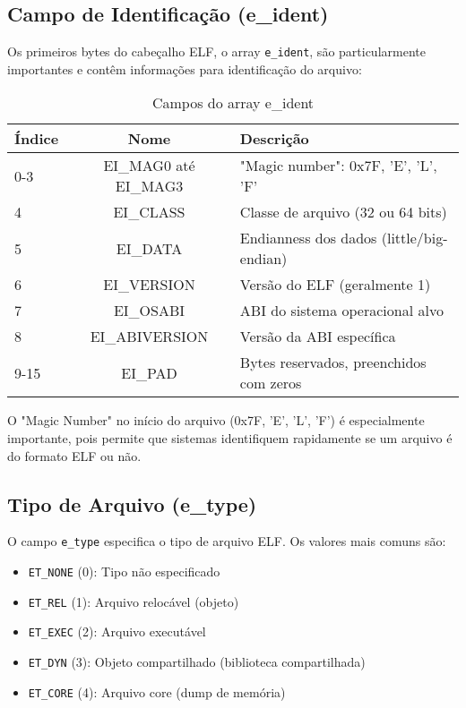 \subsection{Campo de Identificação (e\_ident)}\label{subsec:e_ident}

Os primeiros bytes do cabeçalho ELF, o array \texttt{e\_ident}, são particularmente importantes e contêm informações para identificação do arquivo:

\begin{table}[ht]
    \centering
    \caption{Campos do array e\_ident}
    \label{tab:e_ident_fields}
    \begin{tabular}{|l|c|l|}
        \hline
        \textbf{Índice} & \textbf{Nome} & \textbf{Descrição} \\
        \hline
        0-3 & EI\_MAG0 até EI\_MAG3 & "Magic number": 0x7F, 'E', 'L', 'F' \\
        4 & EI\_CLASS & Classe de arquivo (32 ou 64 bits) \\
        5 & EI\_DATA & Endianness dos dados (little/big-endian) \\
        6 & EI\_VERSION & Versão do ELF (geralmente 1) \\
        7 & EI\_OSABI & ABI do sistema operacional alvo \\
        8 & EI\_ABIVERSION & Versão da ABI específica \\
        9-15 & EI\_PAD & Bytes reservados, preenchidos com zeros \\
        \hline
    \end{tabular}
\end{table}

O "Magic Number" no início do arquivo (0x7F, 'E', 'L', 'F') é especialmente importante, pois permite que sistemas identifiquem rapidamente se um arquivo é do formato ELF ou não.

\subsection{Tipo de Arquivo (e\_type)}\label{subsec:e_type}

O campo \texttt{e\_type} especifica o tipo de arquivo ELF. Os valores mais comuns são:

\begin{itemize}
    \item \texttt{ET\_NONE} (0): Tipo não especificado
    \item \texttt{ET\_REL} (1): Arquivo relocável (objeto)
    \item \texttt{ET\_EXEC} (2): Arquivo executável
    \item \texttt{ET\_DYN} (3): Objeto compartilhado (biblioteca compartilhada)
    \item \texttt{ET\_CORE} (4): Arquivo core (dump de memória)
\end{itemize}

